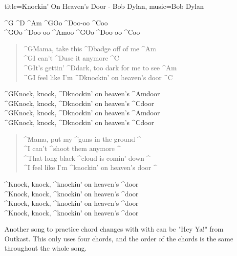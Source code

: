 \begin{song}[verse/numbered, remember-chords, align-chords=l]{title={Knockin' On Heaven's Door - Bob Dylan}, music={Bob Dylan}}
	\begin{intro}	
		^{G}   ^{D}      ^{Am}     ^{G}Oo ^{D}oo-oo ^{C}oo \\
		^{G}Oo ^{D}oo-oo ^{Am}oo   ^{G}Oo ^{D}oo-oo ^{C}oo \\
	\end{intro}
	\begin{verse}
		^{G}Mama, take this ^{D}badge off of me ^{Am} \\
		^{G}I can’t ^{D}use it anymore ^{C} \\
		^{G}It’s gettin’ ^{D}dark, too dark for me to see ^{Am} \\
		^{G}I feel like I’m ^{D}knockin’ on heaven’s door ^{C} \\
	\end{verse}
	\begin{chorus}
		^{G}Knock, knock, ^{D}knockin’ on heaven’s ^{Am}door \\
		^{G}Knock, knock, ^{D}knockin’ on heaven’s ^{C}door \\
		^{G}Knock, knock, ^{D}knockin’ on heaven’s ^{Am}door \\
		^{G}Knock, knock, ^{D}knockin’ on heaven’s ^{C}door \\
	\end{chorus}
	\begin{verse}
		^Mama, put my ^guns in the ground ^ {} \\
		^I can’t ^shoot them anymore ^ {} \\
		^That long black ^cloud is comin’ down ^ {} \\
		^I feel like I’m ^knockin’ on heaven’s door ^ {} \\
	\end{verse}
	\begin{chorus}
		^Knock, knock, ^knockin’ on heaven’s ^door \\
		^Knock, knock, ^knockin’ on heaven’s ^door \\
		^Knock, knock, ^knockin’ on heaven’s ^door \\
		^Knock, knock, ^knockin’ on heaven’s ^door \\
	\end{chorus}
\end{song}

\newpage

Another song to practice chord changes with with can be "Hey Ya!" from Outkast. This only uses four chords, and the order of the chords is the same throughout the whole song.

